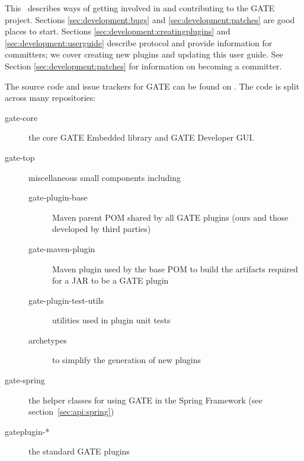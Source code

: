 \nnormalsize


This \chapthing\ describes ways of getting involved in and contributing to the
GATE project. Sections \ref{sec:development:bugs} and
\ref{sec:development:patches} are good places to start. Sections
\ref{sec:development:creatingplugins} and \ref{sec:development:userguide}
describe protocol and provide information for committers; we cover creating new
plugins and updating this user guide. See Section \ref{sec:development:patches}
for information on becoming a committer.



The source code and issue trackers for GATE can be found on
.  The code is split across many
repositories:
\begin{description}
\item[gate-core] the core GATE Embedded library and GATE Developer GUI.
\item[gate-top] miscellaneous small components including
  \begin{description}
  \item[gate-plugin-base] Maven parent POM shared by all GATE plugins (ours and
    those developed by third parties)
  \item[gate-maven-plugin] Maven plugin used by the base POM to build the
    artifacts required for a JAR to be a GATE plugin
  \item[gate-plugin-test-utils] utilities used in plugin unit tests
  \item[archetypes] to simplify the generation of new plugins
  \end{description}
\item[gate-spring] the helper classes for using GATE in the Spring Framework
  (see section~\ref{sec:api:spring})
\item[gateplugin-*] the standard GATE plugins
\end{description}

